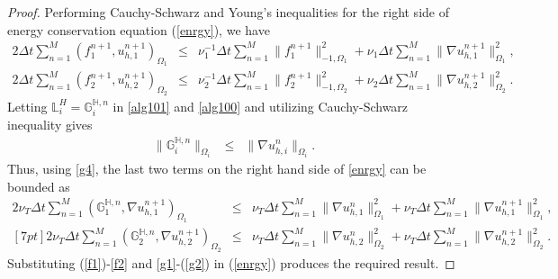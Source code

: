 \documentclass[10pt]{article}%
\numberwithin{equation}{section}
\newcommand{\bff}{{  f}}
\newcommand{\bu}{{\bf u}}
\begin{document}
\begin{proof}
	Performing Cauchy-Schwarz and Young's inequalities for the right side of energy conservation equation (\ref{enrgy}), we have
	\begin{eqnarray}
	2\Delta t\sum_{n=1}^M(f_1^{n+1},u_{h,1}^{n+1})_{\Omega_1}&\leq& {\nu_1^{-1} \Delta t}\sum_{n=1}^M\|f_1^{n+1}\|_{-1,\Omega_1}^2+{\nu_1\Delta t}\sum_{n=1}^M\|\nabla u_{h,1}^{n+1}\|_{\Omega_1}^2, \label{f1}\\2\Delta t \sum_{n=1}^M(\bff_2^{n+1},u_{h,2}^{n+1})_{\Omega_2}&\leq&{\nu_2^{-1} \Delta t}\sum_{n=1}^M\|f_2^{n+1}\|_{-1,\Omega_2}^2+{\nu_2\Delta t}\sum_{n=1}^M\|\nabla u_{h,2}^{n+1}\|_{\Omega_2}^2.\label{f2}
	\end{eqnarray}
	Letting $\mathbb{L}_i^H=\mathbb{G}_i^{\mathbb{H},n}$ in \eqref{alg101} and \eqref{alg100} and utilizing Cauchy-Schwarz inequality gives
	\begin{eqnarray}
	\|\mathbb{G}_i^{\mathbb{H},n}\|_{\Omega_i}&\leq &\|\nabla u_{h,i}^{n}\|_{\Omega_i}. \label{g4}
	\end{eqnarray}
	Thus, using \eqref{g4}, the last two terms on the right hand side of \eqref{enrgy} can be bounded as
	\begin{eqnarray}
	2\nu_T\Delta t\sum_{n=1}^M(\mathbb{G}_1^{\mathbb{H},n},\nabla u_{h,1}^{n+1})_{\Omega_1}
	&\leq& {\nu_T\Delta t}\sum_{n=1}^M\|\nabla u_{h,1}^n\|_{\Omega_1}^2+{\nu_T\Delta t}\sum_{n=1}^M\|\nabla u_{h,1}^{n+1}\|_{\Omega_1}^2, \label{g1}\\
	[7pt]2\nu_T\Delta t\sum_{n=1}^M(\mathbb{G}_2^{\mathbb{H},n},\nabla u_{h,2}^{n+1})_{\Omega_2}
	&\leq& {\nu_T \Delta t}\sum_{n=1}^M\|\nabla u_{h,2}^n\|_{\Omega_2}^2+{\nu_T\Delta t}\sum_{n=1}^M\|\nabla u_{h,2}^{n+1}\|_{\Omega_2}^2. \label{g2}
	\end{eqnarray}
	Substituting (\ref{f1})-\eqref{f2} and \eqref{g1}-(\ref{g2}) in (\ref{enrgy}) produces the required result.

\end{proof}
\end{document}
